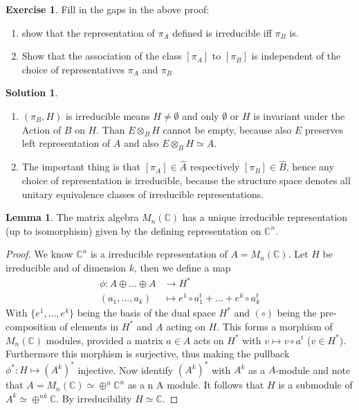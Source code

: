 \documentclass[a4paper]{article}
\theoremstyle{definition}
\theoremstyle{definition}
\theoremstyle{definition}
\theoremstyle{theorem}
\theoremstyle{theorem}
\newtheorem{exercise}{Exercise}
\theoremstyle{theorem}
\newtheorem{lemma}{Lemma}
\theoremstyle{definition}
\newtheorem{solution}{Solution}
\begin{document}
\begin{exercise}
    Fill in the gaps in the above proof:
    \begin{enumerate}
        \item show that the representation of $\pi _A$ defined is irreducible iff $\pi _B$ is.
        \item Show that the association of the class $[\pi _A]$ to $[\pi _B]$ is independent
            of the choice of representatives $\pi _A$ and $\pi _B$
    \end{enumerate}
\end{exercise}

\begin{solution}
    \
    \begin{enumerate}
        \item $(\pi _B, H)$ is irreducible means $H \neq \emptyset$ and only $\emptyset$ or $H$
            is invariant under the Action of $B$ on $H$.
            Than $E\otimes _B H$ cannot be empty, because also $E$ preserves left representation of $A$
            and also $E\otimes _B H \simeq A$.
        \item The important thing is that $[\pi _A] \in \hat{A}$ respectively $[\pi _B] \in \hat{B}$,
            hence any choice of representation is irreducible, because the structure space denotes all unitary
            equivalence classes of irreducible representations.
    \end{enumerate}
\end{solution}

    \begin{lemma}
    The matrix algebra $M_n(\mathbb{C})$ has a unique irreducible representation (up to isomorphism)
    given by the defining representation on $\mathbb{C}^n$.
\end{lemma}
\begin{proof}
    We know $\mathbb{C}^n$ is a irreducible representation of $A= M_n(\mathbb{C})$. Let $H$ be irreducible
    and of dimension $k$, then we define a map
    \begin{align*}
        \phi : A\oplus...\oplus A &\rightarrow H^* \\
        (a_1,...,a_k)             &\mapsto e^1\circ a_1^t+...+e^k\circ a_k^t
    \end{align*}
    With $\{e^1,...,e^k\}$ being the basis of the dual space $H^*$ and $(\circ)$ being the pre-composition
    of elements in $H^*$ and $A$ acting on $H$. This forms a morphism of $M_n(\mathbb{C})$ modules,
    provided a matrix $a \in A$ acts on $H^*$ with $v\mapsto v\circ a^t$ ($v\in H^*$).
    Furthermore this morphism is surjective, thus making the pullback $\phi ^*:H\mapsto (A^k)^*$ injective.
    Now identify $(A^k)^*$ with $A^k$ as a $A$-module and note that
    $A=M_n(\mathbb{C}) \simeq \oplus ^n \mathbb{C}^n$ as a n A module.
    It follows that $H$ is a submodule of $A^k \simeq \oplus ^{nk}\mathbb{C}$. By irreducibility
    $H \simeq \mathbb{C}$.
\end{proof}
\end{document}
